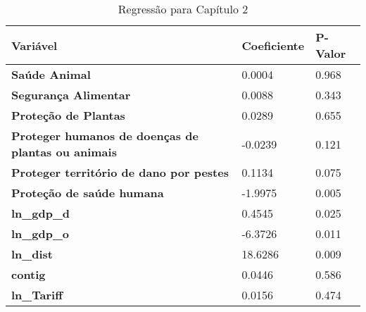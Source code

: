 \begin{table}[ht!]
    \begin{tabular}{@{}l|l|l@{}}
    \toprule
    \textbf{Variável}                                          & \textbf{Coeficiente} & \textbf{P-Valor} \\ \midrule
    \textbf{Saúde Animal}                                      & 0.0004               & 0.968            \\ \midrule
    \textbf{Segurança Alimentar}                               & 0.0088               & 0.343            \\ \midrule
    \textbf{Proteção de Plantas}                               & 0.0289               & 0.655            \\ \midrule
    \textbf{Proteger humanos de doenças de plantas ou animais} & -0.0239              & 0.121            \\ \midrule
    \textbf{Proteger território de dano por pestes}            & 0.1134               & 0.075            \\ \midrule
    \textbf{Proteção de saúde humana}                          & -1.9975              & 0.005            \\ \midrule
    \textbf{ln\_gdp\_d}                                        & 0.4545               & 0.025            \\ \midrule
    \textbf{ln\_gdp\_o}                                        & -6.3726              & 0.011            \\ \midrule
    \textbf{ln\_dist}                                          & 18.6286              & 0.009            \\ \midrule
    \textbf{contig}                                            & 0.0446               & 0.586            \\ \midrule
    \textbf{ln\_Tariff}                                        & 0.0156               & 0.474            \\ \bottomrule
    \end{tabular}
\caption{Regressão para Capítulo 2}
\end{table}